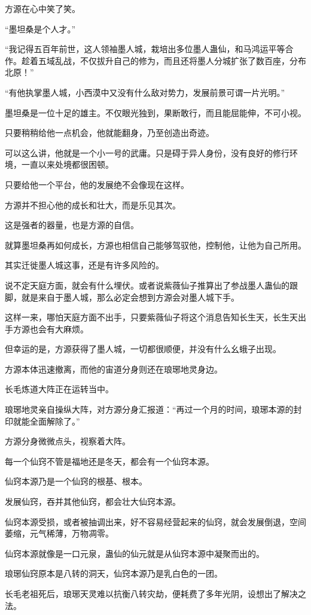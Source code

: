 \begin{this_body}
方源在心中笑了笑。

“墨坦桑是个人才。”

“我记得五百年前世，这人领袖墨人城，栽培出多位墨人蛊仙，和马鸿运平等合作。趁着五域乱战，不仅拔升自己的修为，而且还将墨人分城扩张了数百座，分布北原！”

“有他执掌墨人城，小西漠中又没有什么敌对势力，发展前景可谓一片光明。”

墨坦桑是一位十足的雄主。不仅眼光独到，果断敢行，而且能屈能伸，不可小视。

只要稍稍给他一点机会，他就能翻身，乃至创造出奇迹。

可以这么讲，他就是一个小一号的武庸。只是碍于异人身份，没有良好的修行环境，一直以来处境都很困顿。

只要给他一个平台，他的发展绝不会像现在这样。

方源并不担心他的成长和壮大，而是乐见其次。

这是强者的器量，也是方源的自信。

就算墨坦桑再如何成长，方源也相信自己能够驾驭他，控制他，让他为自己所用。

其实迁徙墨人城这事，还是有许多风险的。

说不定天庭方面，就会有什么埋伏。或者说紫薇仙子推算出了参战墨人蛊仙的跟脚，就是来自于墨人城，那么必定会想到方源会对墨人城下手。

这样一来，哪怕天庭方面不出手，只要紫薇仙子将这个消息告知长生天，长生天出手方源也会有大麻烦。

但幸运的是，方源获得了墨人城，一切都很顺便，并没有什么幺蛾子出现。

方源本体迅速撤离，而他的宙道分身则还在琅琊地灵身边。

长毛炼道大阵正在运转当中。

琅琊地灵亲自操纵大阵，对方源分身汇报道：“再过一个月的时间，琅琊本源的封印就能全面解除了。”

方源分身微微点头，视察着大阵。

每一个仙窍不管是福地还是冬天，都会有一个仙窍本源。

仙窍本源乃是一个仙窍的根基、根本。

发展仙窍，吞并其他仙窍，都会壮大仙窍本源。

仙窍本源受损，或者被抽调出来，好不容易经营起来的仙窍，就会发展倒退，空间萎缩，元气稀薄，万物凋零。

仙窍本源就像是一口元泉，蛊仙的仙元就是从仙窍本源中凝聚而出的。

琅琊仙窍原本是八转的洞天，仙窍本源乃是乳白色的一团。

长毛老祖死后，琅琊天灵难以抗衡八转灾劫，便耗费了多年光阴，设想出了解决之法。


\end{this_body}
